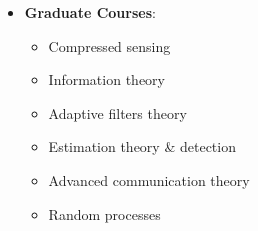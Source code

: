
\begin{itemize}
	\item \textbf{Graduate Courses}:
	      \begin{itemize}
		      \item Compressed sensing
		      \item Information theory
		      \item Adaptive filters theory
		      \item Estimation theory \& detection
		      \item Advanced communication theory
		      \item Random processes
		            \\
	      \end{itemize}
\end{itemize}
